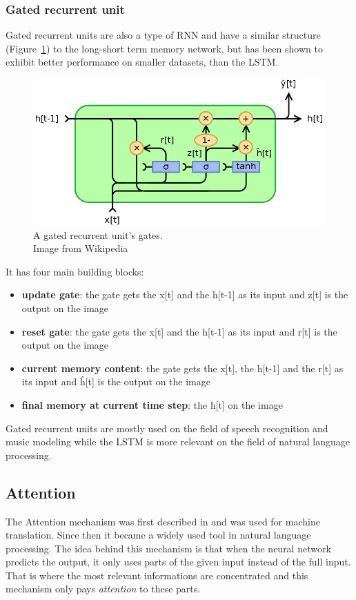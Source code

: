 \subsubsection{Gated recurrent unit}
Gated recurrent units are also a type of RNN and have a similar structure (Figure~\ref{fig:gru}) to the long-short term memory network, but has been shown to exhibit better performance on smaller datasets, than the LSTM.
\begin{figure}[!htb]
	\centering
	\includegraphics[scale=0.5]{gru.jpg}
	\caption{A gated recurrent unit's gates.\\Image from Wikipedia}
	\label{fig:gru}
\end{figure}

It has four main building blocks:
\begin{itemize}
	\item \textbf{update gate}: the gate gets the x[t] and the h[t-1] as its input and z[t] is the output on the image
	\item \textbf{reset gate}: the gate gets the x[t] and the h[t-1] as its input and r[t] is the output on the image
	\item \textbf{current memory content}: the gate gets the x[t], the h[t-1] and the r[t] as its input and \^{h}[t] is the output on the image
	\item \textbf{final memory at current time step}: the h[t] on the image
\end{itemize}

Gated recurrent units are mostly used on the field of speech recognition and music modeling while the LSTM is more relevant on the field of natural language processing.

\subsection{Attention}
The Attention mechanism was first described in \cite{Bahdanau:2015} and was used for machine translation. Since then it became a widely used tool in natural language processing. The idea behind this mechanism is that when the neural network predicts the output, it only uses parts of the given input instead of the full input. That is where the most relevant informations are concentrated and this mechanism only pays \textit{attention} to these parts.